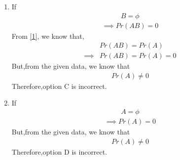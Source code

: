 \documentclass[journal,12pt,twocolumn]{IEEEtran}
\begin{document}
\begin{enumerate}[label={\Alph*)}]
 \item If 
 \begin{align}
     B=\phi
 \end{align}
\begin{align}
\implies Pr(AB)=0
\end{align}From \eqref{1}, we know that,
\begin{align}
& Pr(AB)=Pr(A)\\
\implies & Pr(AB)=Pr(A)=0
\end{align}
But,from the given data, we know that 
\begin{align}
     Pr(A) \neq 0
 \end{align}
Therefore,option C is incorrect.

\item If 
\begin{align}
     A=\phi
 \end{align}
\begin{align}
\implies Pr(A)=0
\end{align}
But,from the given data, we know that 
\begin{align}
     Pr(A) \neq 0
 \end{align}
Therefore,option D is incorrect.
\end{enumerate}
\end{document}
